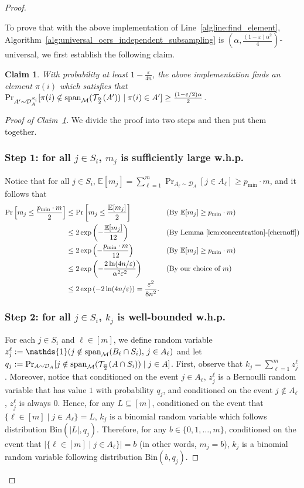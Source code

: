 \documentclass[11pt]{article}
\newcommand{\D}{\mathcal D}
\def \E {\mathbb{E}}
\newcommand{\M}{{\mathcal M}}
\newcommand{\T}{{\mathcal T}}
\newcommand{\eps}{\varepsilon}
\newcommand{\spa}{\textnormal{span}}
\newtheorem{claim}[theorem]{Claim}
\begin{document}
\begin{proof}
\begin{enumerate}[(1)]
\end{enumerate}
To prove that with the above implementation of Line~\ref{algline:find_element}, Algorithm~\ref{alg:universal_ocrs_independent_subsampling} is $(\alpha,\frac{(1-\eps)\alpha^2}{4})$-universal, we first establish the following claim.
\begin{claim}\label{claim:find_element_whp}
With probability at least $1-\frac{\eps}{4n}$, the above implementation finds an element $\pi(i)$ which satisfies that ${\Pr}_{A'\sim \D_A^{S_i}}[\pi(i)\notin \spa_{\M}(\T_{\frac{\alpha}{2}}(A'))\mid \pi(i)\in A']\ge\frac{(1-\eps/2)\alpha}{2}$.
\end{claim}
\begin{proof}[Proof of Claim~\ref{claim:find_element_whp}]
We divide the proof into two steps and then put them together.
\subsubsection*{Step 1: for all $j\in S_i$, $m_j$ is sufficiently large w.h.p.}
Notice that for all $j\in S_i$, $\E[m_j]=\sum_{\ell=1}^m\Pr_{A_{\ell}\sim\D_{A}}[j\in A_{\ell}]\ge p_{\min}\cdot m$, and it follows that
\begin{align}
    \Pr\left[m_j \le \frac{p_{\min}\cdot m}{2}\right]&\le\Pr\left[m_j \le \frac{\E[m_j]}{2}\right] &&\text{(By $\E[m_j]\ge p_{\min}\cdot m$)}\nonumber\\
    &\le 2\exp\left(-\frac{\E[m_j]}{12}\right) &&\text{(By Lemma~\ref{lem:concentration}-\ref{chernoff})} \nonumber\\
    &\le 2\exp\left(-\frac{p_{\min}\cdot m}{12}\right) &&\text{(By $\E[m_j]\ge p_{\min}\cdot m$)}\nonumber\\
    &\le 2\exp\left(-\frac{2\ln(4n/\eps)}{\alpha^2\eps^2}\right) &&\text{(By our choice of $m$)}\nonumber\\
    &\le2\exp\left(-2\ln(4n/\eps)\right)=\frac{\eps^2}{8n^2}.\label{eq:m_j}
\end{align}
\subsubsection*{Step 2: for all $j\in S_i$, $k_j$ is well-bounded w.h.p.}
For each $j\in S_i$ and $\ell\in[m]$, we define random variable $z_j^{\ell}:=\mathds{1}(j\notin \spa_{\M}(B_{\ell}\cap S_i),\,j\in A_{\ell})$ and let $q_j:=\Pr_{A\sim \D_A}[j\notin \spa_{\M}(\T_{\frac{\alpha}{2}}(A\cap S_i))\mid j\in A]$. First, observe that $k_j=\sum_{\ell=1}^m z_j^{\ell}$. Moreover, notice that conditioned on the event $j\in A_{\ell}$, $z_j^{\ell}$ is a Bernoulli random variable that has value $1$ with probability $q_j$, and conditioned on the event $j\notin A_{\ell}$, $z_j^{\ell}$ is always $0$. Hence, for any $L\subseteq[m]$, conditioned on the event that $\{\ell\in[m]\mid j\in A_{\ell}\}=L$, $k_j$ is a binomial random variable which follows distribution $\textrm{Bin}(|L|,q_j)$. Therefore, for any $b\in\{0,1,\dots,m\}$, conditioned on the event that $|\{\ell\in[m]\mid j\in A_{\ell}\}|=b$ (in other words, $m_j=b$), $k_j$ is a binomial random variable following distribution $\textrm{Bin}(b,q_j)$.


\end{proof}
\end{proof}
\end{document}
